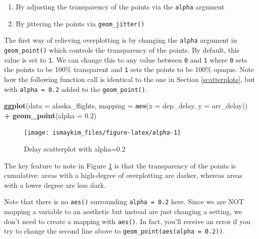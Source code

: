 \documentclass[12pt,]{krantz}
\makeatletter
\newenvironment{Shaded}{\begin{snugshade}}{\end{snugshade}}
\newcommand{\KeywordTok}[1]{\textcolor[rgb]{0.27,0.27,0.27}{\textbf{#1}}}
\newcommand{\DataTypeTok}[1]{\textcolor[rgb]{0.27,0.27,0.27}{#1}}
\newcommand{\FloatTok}[1]{\textcolor[rgb]{0.06,0.06,0.06}{#1}}
\newcommand{\StringTok}[1]{\textcolor[rgb]{0.5,0.5,0.5}{#1}}
\newcommand{\OperatorTok}[1]{\textcolor[rgb]{0.43,0.43,0.43}{\textbf{#1}}}
\newcommand{\NormalTok}[1]{#1}
\providecommand{\tightlist}{%
  \setlength{\itemsep}{0pt}\setlength{\parskip}{0pt}}
\newenvironment{kframe}{%
\medskip{}
\setlength{\fboxsep}{.8em}
 \def\at@end@of@kframe{}%
 \ifinner\ifhmode%
  \def\at@end@of@kframe{\end{minipage}}%
  \begin{minipage}{\columnwidth}%
 \fi\fi%
 \def\FrameCommand##1{\hskip\@totalleftmargin \hskip-\fboxsep
 \colorbox{shadecolor}{##1}\hskip-\fboxsep
     \hskip-\linewidth \hskip-\@totalleftmargin \hskip\columnwidth}%
 \MakeFramed {\advance\hsize-\width
   \@totalleftmargin\z@ \linewidth\hsize
   \@setminipage}}%
 {\par\unskip\endMakeFramed%
 \at@end@of@kframe}
\renewenvironment{Shaded}{\begin{kframe}}{\end{kframe}}
\makeatother
\begin{document}
\begin{enumerate}
\def\labelenumi{\arabic{enumi}.}
\tightlist
\item
  By adjusting the transparency of the points via the \texttt{alpha}
  argument
\item
  By jittering the points via \texttt{geom\_jitter()}
\end{enumerate}

The first way of relieving overplotting is by changing the
\texttt{alpha} argument in \texttt{geom\_point()} which controls the
transparency of the points. By default, this value is set to \texttt{1}.
We can change this to any value between \texttt{0} and \texttt{1} where
\texttt{0} sets the points to be 100\% transparent and \texttt{1} sets
the points to be 100\% opaque. Note how the following function call is
identical to the one in Section \ref{scatterplots}, but with
\texttt{alpha\ =\ 0.2} added to the \texttt{geom\_point()}.

\begin{Shaded}
\begin{Highlighting}[]
\KeywordTok{ggplot}\NormalTok{(}\DataTypeTok{data =}\NormalTok{ alaska_flights, }
       \DataTypeTok{mapping =} \KeywordTok{aes}\NormalTok{(}\DataTypeTok{x =}\NormalTok{ dep_delay, }\DataTypeTok{y =}\NormalTok{ arr_delay)) }\OperatorTok{+}\StringTok{ }
\StringTok{  }\KeywordTok{geom_point}\NormalTok{(}\DataTypeTok{alpha =} \FloatTok{0.2}\NormalTok{)}
\end{Highlighting}
\end{Shaded}

\begin{figure}

{\centering \texttt{[image: ismaykim\_files/figure-latex/alpha-1]} 

}

\caption{Delay scatterplot with alpha=0.2}\label{fig:alpha}
\end{figure}

The key feature to note in Figure \ref{fig:alpha} is that the
transparency of the points is cumulative: areas with a high-degree of
overplotting are darker, whereas areas with a lower degree are less
dark.

Note that there is no \texttt{aes()} surrounding \texttt{alpha\ =\ 0.2}
here. Since we are NOT mapping a variable to an aesthetic but instead
are just changing a setting, we don't need to create a mapping with
\texttt{aes()}. In fact, you'll receive an error if you try to change
the second line above to \texttt{geom\_point(aes(alpha\ =\ 0.2))}.
\end{document}
